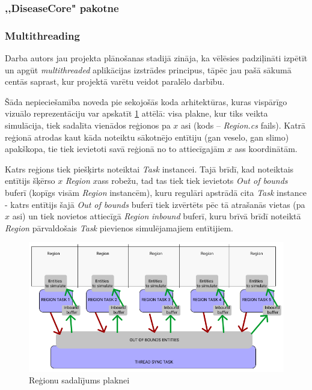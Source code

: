 \subsubsection{,,DiseaseCore" pakotne}
\subsubsection*{Multithreading}
Darba autors jau projekta plānošanas stadijā zināja, ka vēlēsies padziļināti
izpētīt un apgūt \emph{multithreaded} aplikācijas izstrādes principus, tāpēc jau pašā sākumā
centās saprast, kur projektā varētu veidot paralēlo darbību.

Šāda nepieciešamība noveda pie sekojošās koda arhitektūras, kuras vispārīgo
vizuālo reprezentāciju var apskatīt \ref{img:multithreaded-layout} attēlā: visa plakne, kur tiks
veikta simulācija, tiek sadalīta vienādos reģionos pa \(x\) asi (kods -- \emph{Region.cs} fails).
Katrā reģionā atrodas kaut kāda noteiktu sākotnējo entītiju (gan veselo, gan slimo) apakškopa,
tie tiek ievietoti savā reģionā no to attiecīgajām \(x\) ass koordinātām.

Katrs reģions tiek piešķirts noteiktai \emph{Task}\cite{csharp:task} instancei.
Tajā brīdī, kad noteiktais entītijs šķērso \(x\) \emph{Region} \(x\)ass robežu, tad tas tiek tiek
ievietots \emph{Out of bounds} buferī (kopīgs visām \emph{Region} instancēm), kuru
regulāri apstrādā cita \emph{Task} instance - katrs entītijs šajā \emph{Out of bounds} buferī tiek
izvērtēts pēc tā atrašanās vietas (pa \(x\) asi) un tiek novietos attiecīgā \emph{Region}
\emph{inbound} buferī, kuru brīvā brīdī noteiktā \emph{Region} pārvaldošais \emph{Task} pievienos
simulējamajiem entītijiem.


\begin{figure}[H]
	\centering
	\includegraphics[scale=0.5]{images/multithreaded-layout.png}
	\caption{Reģionu sadalījums plaknei}
	\label{img:multithreaded-layout}
\end{figure}

